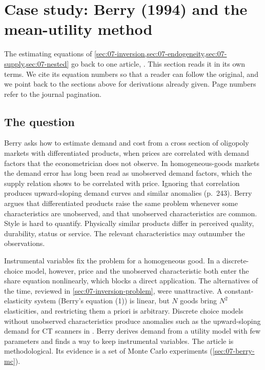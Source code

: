 \section{Case study: Berry (1994) and the mean-utility method}\label{sec:07-berry}

The estimating equations of \cref{sec:07-inversion,sec:07-endogeneity,sec:07-supply,sec:07-nested} go back to
one article, \citet{Berry1994}. This section reads it in its own terms. We cite its equation numbers so that a
reader can follow the original, and we point back to the sections above for derivations already given. Page
numbers refer to the journal pagination.

\subsection{The question}\label{sec:07-berry-question}

Berry asks how to estimate demand and cost from a cross section of oligopoly markets with differentiated
products, when prices are correlated with demand factors that the econometrician does not observe. In
homogeneous-goods markets the demand error has long been read as unobserved demand factors, which the supply
relation shows to be correlated with price. Ignoring that correlation produces upward-sloping demand curves and
similar anomalies (p.~243). Berry argues that differentiated products raise the same problem whenever some
characteristics are unobserved, and that unobserved characteristics are common. Style is hard to quantify. Physically similar
products differ in perceived quality, durability, status or service. The relevant characteristics may outnumber
the observations.

Instrumental variables fix the problem for a homogeneous good. In a discrete-choice model, however, price and the
unobserved characteristic both enter the share equation nonlinearly, which blocks a direct application. The
alternatives of the time, reviewed in \cref{sec:07-inversion-problem}, were unattractive. A constant-elasticity
system (Berry's equation (1)) is linear, but $N$ goods bring $N^2$ elasticities, and restricting them a priori is
arbitrary. Discrete choice models without unobserved characteristics produce anomalies such as the
upward-sloping demand for CT scanners in \citet{Trajtenberg1989}. Berry derives demand from a utility model with
few parameters and finds a way to keep instrumental variables. The article is methodological. Its evidence is a
set of Monte Carlo experiments (\cref{sec:07-berry-mc}).

